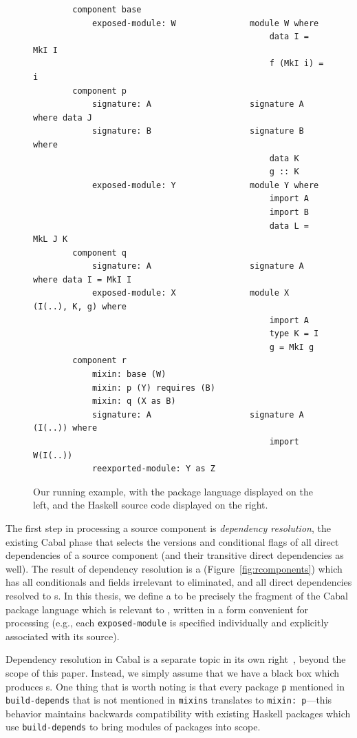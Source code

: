 \begin{figure}
\begin{verbatim}
        component base
            exposed-module: W               module W where
                                                data I = MkI I
                                                f (MkI i) = i
        component p
            signature: A                    signature A where data J
            signature: B                    signature B where
                                                data K
                                                g :: K
            exposed-module: Y               module Y where
                                                import A
                                                import B
                                                data L = MkL J K
        component q
            signature: A                    signature A where data I = MkI I
            exposed-module: X               module X (I(..), K, g) where
                                                import A
                                                type K = I
                                                g = MkI g
        component r
            mixin: base (W)
            mixin: p (Y) requires (B)
            mixin: q (X as B)
            signature: A                    signature A (I(..)) where
                                                import W(I(..))
            reexported-module: Y as Z
\end{verbatim}
  \caption{Our running example, with the package language displayed
  on the left, and the Haskell source code displayed on the right.}\label{fig:resolved-example}
\end{figure}

The first step in
processing a source component is \emph{dependency resolution},
the existing Cabal phase that
selects the versions and conditional flags of all direct dependencies of
a source component (and their transitive direct dependencies as well).
The result of dependency resolution is a \emph{\ccomp}
(Figure~\ref{fig:rcomponents}) which has all conditionals and fields
irrelevant to \Backpack{} eliminated, and all direct dependencies
resolved to \cid{}s.  In this thesis, we define a \ccomp{} to be precisely the fragment of the
Cabal package language which is relevant to \Backpack{}, written in a
form convenient for processing (e.g., each \verb|exposed-module| is
specified individually and explicitly associated with its source).

Dependency resolution in Cabal is a separate topic in its own
right~\cite{well-typed-solver, well-typed-qualified}, beyond the scope of this paper.
Instead, we simply assume that we have a black box which
produces \ccomp{}s.  One thing that is worth noting is that
every package \verb|p| mentioned in \verb|build-depends|
that is not mentioned in \verb|mixins| translates to
\verb|mixin: p|---this behavior maintains backwards compatibility
with existing Haskell packages which use \verb|build-depends| to
bring modules of packages into scope.

